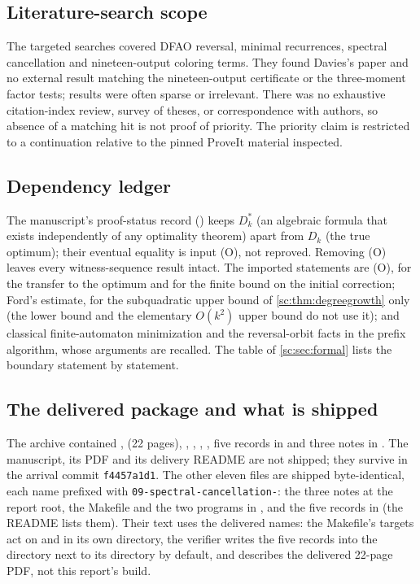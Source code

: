 \documentclass[11pt,a4paper]{article}
\numberwithin{equation}{section}
\theoremstyle{definition}
\theoremstyle{remark}
\begin{document}
\subsection{Literature-search scope}
The targeted searches covered DFAO reversal, minimal recurrences, spectral
cancellation and nineteen-output coloring terms. They found Davies's paper
and no external result matching the nineteen-output certificate or the
three-moment factor tests; results were often sparse or irrelevant. There
was no exhaustive citation-index review, survey of theses, or
correspondence with authors, so absence of a matching hit is not proof of
priority. The priority claim is restricted to a continuation relative to
the pinned ProveIt material inspected.

\subsection{Dependency ledger}
The manuscript's proof-status record
() keeps $D^*_k$ (an
algebraic formula that exists independently of any optimality theorem)
apart from $D_k$ (the true optimum); their eventual equality is input (O),
not reproved. Removing (O) leaves every witness-sequence result intact. The
imported statements are (O), for the transfer to the optimum and for the
finite bound on the initial correction; Ford's estimate, for the
subquadratic upper bound of \cref{sc:thm:degreegrowth} only (the lower
bound and the elementary $O(k^2)$ upper bound do not use it); and
classical finite-automaton minimization and the reversal-orbit facts in
the prefix algorithm, whose arguments are recalled. The table of
\cref{sc:sec:formal} lists the boundary statement by statement.

\subsection{The delivered package and what is shipped}
The archive contained ,  (22 pages),
, , ,
, five records in  and three notes in
. The manuscript, its PDF and its delivery README are not
shipped; they survive in the arrival commit \texttt{f4457a1d1}. The other
eleven files are shipped byte-identical, each name prefixed with
\texttt{09-spectral-cancellation-}: the three notes at the report root, the
Makefile and the two programs in , and the five records in
 (the README lists them). Their text uses the delivered names:
the Makefile's targets act on  and 
in its own directory, the verifier writes the five records into the
 directory next to its  directory by default, and
 describes the delivered 22-page
PDF, not this report's build.
\end{document}
